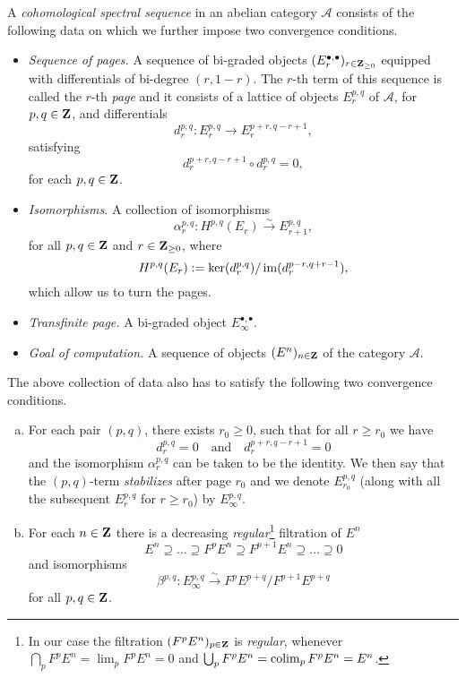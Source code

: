 \begin{definition}
    A \emph{cohomological spectral sequence} in an abelian category $\mathcal A$ consists of the following data on which we further impose two convergence conditions.
\begin{itemize}
    \item \emph{Sequence of pages.} 
    A sequence of bi-graded objects $(E^{\bullet, \bullet}_r)_{r \in \mathbf Z_{\geq 0}}$ equipped with differentials of bi-degree $(r, 1-r)$. The $r$-th term of this sequence is called the $r$-th \emph{page} and it consists of a lattice of objects $E^{p,q}_r$ of $\mathcal A$, for $p, q \in \mathbf Z$, and differentials
    \[
        d^{p,q}_r : E^{p,q}_r \to E^{p + r, q - r + 1}_r,
    \] 
    satisfying
    \[
        d^{p + r, q - r + 1}_r \circ d^{p,q}_r = 0,
    \]
    for each $p, q \in \mathbf Z$.
    \item \emph{Isomorphisms.} A collection of isomorphisms
    \[
        \alpha^{p,q}_r : H^{p,q}(E_r) \xrightarrow{\sim} E^{p,q}_{r + 1},
    \]
    for all $p, q \in \mathbf Z$ and $r \in \mathbf Z_{\geq 0}$, where 
    \[
        H^{p,q}(E_r) := \ker(d^{p,q}_r)/\operatorname{im}(d^{p-r, q + r - 1}_r),
    \]
    which allow us to turn the pages.
    \item \emph{Transfinite page.} A bi-graded object $E^{\bullet, \bullet}_\infty$. 
    \item \emph{Goal of computation.} A sequence of objects $(E^n)_{n \in \mathbf Z}$ of the category $\mathcal A$.
\end{itemize}
The above collection of data also has to satisfy the following two convergence conditions.
\begin{enumerate}[(a)]
    \item For each pair $(p,q)$, there exists $r_0 \geq 0$, such that for all $r \geq r_0$ we have
    \[
        d^{p,q}_r = 0 \quad \text{and} \quad d^{p + r, q - r + 1}_r = 0
    \]
    and the isomorphism $\alpha^{p,q}_r$ can be taken to be the identity. We then say that the $(p,q)$-term \emph{stabilizes} after page $r_0$ and we denote $E^{p,q}_{r_0}$ (along with all the subsequent $E^{p,q}_{r}$ for $r \geq r_0$) by $E^{p,q}_\infty$.
    \item For each $n \in \mathbf Z$ there is a decreasing \emph{regular}\footnote{In our case the filtration $(F^p E^n)_{p \in \mathbf Z}$ is \emph{regular}, whenever $\bigcap_p F^p E^n = \lim_p F^p E^n = 0$ and $\bigcup_p F^p E^n = \operatorname{colim}_p F^p E^n = E^n$.} filtration of $E^n$
    \[
        E^n \supseteq \dots \supseteq F^p E^n \supseteq F^{p + 1}E^n \supseteq \dots \supseteq 0
    \]
    and isomorphisms
    \[
        \beta^{p,q} : E^{p,q}_\infty \xrightarrow{\sim} F^p E^{p + q}/F^{p + 1}E^{p + q}
    \]
    for all $p, q \in \mathbf Z$.
\end{enumerate}


\end{definition}
